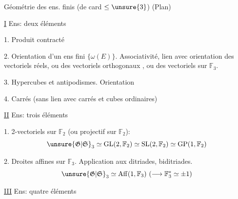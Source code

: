 
Géométrie des ens. finis (de card $\leq\unsure{3}$) \hfill (Plan)

\uline{I} Ens: deux éléments

1. Produit contracté


2. Orientation d'un ens fini $\{\omega(E)\}$. Associativité, lien avec orientation des vectoriels réels, ou des vectoriels orthogonaux , ou des vectoriels sur $\mathbb F_3$.

3. Hypercubes et antipodismes. Orientation 

4. Carrés (sans lien avec carrés et cubes ordinaires)

\uline{II} Ens: trois éléments

1. 2-vectoriels sur $\mathbb F_2$ (ou   projectif sur $\mathbb F_2$):
\[
\unsure{\mathfrak G|\mathfrak S}_3\simeq\mathrm{GL}(2,\mathbb F_2)\simeq\mathrm{SL}(2,\mathbb F_2)\simeq\mathrm{GP}(1,\mathbb F_2)
\]

2. Droites affines sur $\mathbb F_3$. Application aux ditriades, biditriades.
\[
\unsure{\mathfrak G|\mathfrak S}_3\simeq\operatorname{Aff}(1,\mathbb F_3)\ (\longrightarrow\mathbb F_3^*\simeq\pm1)
\]



\uline{III} Ens: quatre éléments


